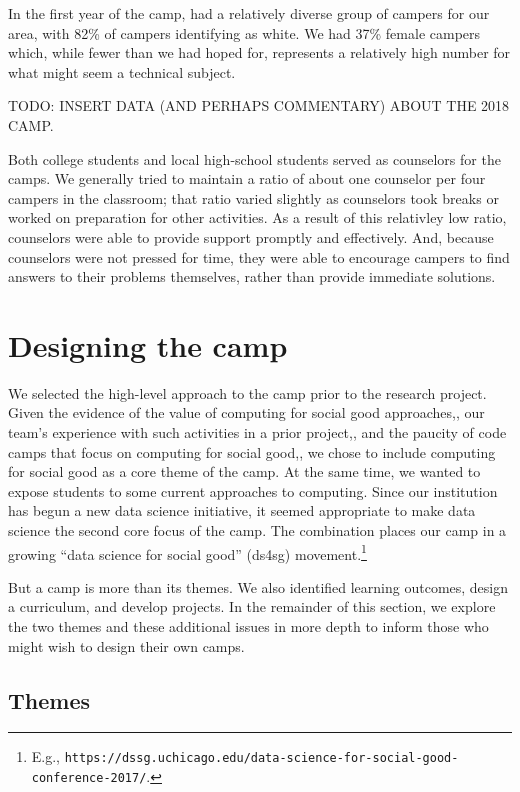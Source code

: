 In the first year of the camp, had a relatively diverse group of
campers for our area, with 82\% of campers identifying as white.
We had 37\% female campers which, while fewer than we had hoped
for, represents a relatively high number for what might seem a
technical subject.

TODO: INSERT DATA (AND PERHAPS COMMENTARY) ABOUT THE 2018 CAMP.

Both college students and local high-school students served as
counselors for the camps.  We generally tried to maintain a ratio
of about one counselor per four campers in the classroom; that ratio
varied slightly as counselors took breaks or worked on preparation
for other activities.  As a result of this relativley low ratio,
counselors were able to provide support promptly and effectively.
And, because counselors were not pressed for time, they were able
to encourage campers to find answers to their problems themselves,
rather than provide immediate solutions.

\section{Designing the camp}

We selected the high-level approach to the camp prior to the
research project.  Given the evidence of the value of computing for
social good approaches,\cite{Goldweber2013}, our team's experience
with such activities in a prior project,\cite{arts-coding}, and the
paucity of code camps that focus on computing for social
good,\cite{code-camp-survey-sigcse-2017}, we chose to include
computing for social good as a core theme of the camp.  At the same
time, we wanted to expose students to some current approaches to
computing.  Since our institution has begun a new data science
initiative, it seemed appropriate to make data science the second
core focus of the camp.  The combination places our camp in a growing
``data science for social good'' (ds4sg) movement.\footnote{E.g.,
\texttt{https://dssg.uchicago.edu/data-science-for-social-good-conference-2017/}.}

But a camp is more than its themes.  We also identified learning
outcomes, design a curriculum, and develop projects.  In the remainder
of this section, we explore the two themes and these additional
issues in more depth to inform those who might wish to design their
own camps.

\subsection{Themes}

